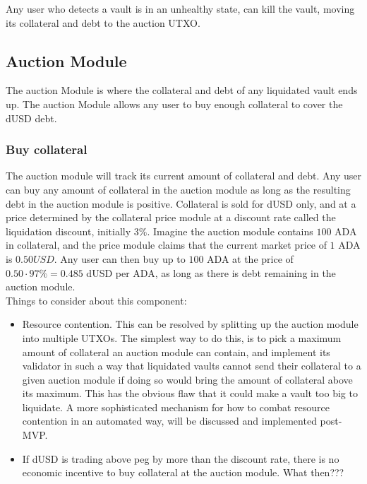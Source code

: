 \documentclass{article} %
\begin{document}
Any user who detects a vault is in an unhealthy state, can kill the vault,
moving its collateral and debt to the auction UTXO. \\

\subsection{Auction Module}

The auction Module is where the collateral and debt of any liquidated vault ends
up. The auction Module allows any user to buy enough collateral to cover the
dUSD debt.

\subsubsection*{Buy collateral}

The auction module will track its current amount of collateral and debt.  Any
user can buy any amount of collateral in the auction module as long as the
resulting debt in the auction module is positive. Collateral is sold for dUSD
only, and at a price determined by the collateral price module at a discount
rate called the liquidation discount, initially $3\%$. Imagine the auction
module contains $100$ ADA in collateral, and the price module claims that the
current market price of $1$ ADA is $0.50 USD$. Any user can then buy up to $100$
ADA at the price of $0.50 \cdot 97\% = 0.485$ dUSD per ADA, as long as there is
debt remaining in the auction module. \\

Things to consider about this component:
\begin{itemize}
  \item Resource contention. This can be resolved by splitting up the auction
    module into multiple UTXOs. The simplest way to do this, is to pick a
    maximum amount of collateral an auction module can contain, and implement
    its validator in such a way that liquidated vaults cannot send their
    collateral to a given auction module if doing so would bring the amount of
    collateral above its maximum. This has the obvious flaw that it could make a
    vault too big to liquidate. A more sophisticated mechanism for how to combat
    resource contention in an automated way, will be discussed and implemented
    post-MVP.
  \item If dUSD is trading above peg by more than the discount rate, there is no
    economic incentive to buy collateral at the auction module. What then???
\end{itemize}
\end{document}
